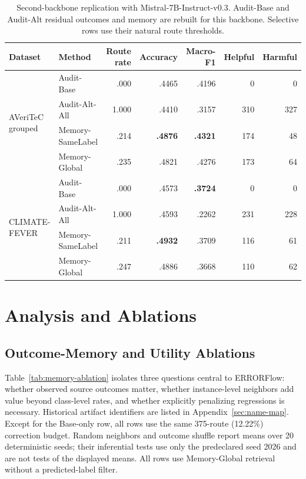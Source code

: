 \documentclass[runningheads]{llncs}
\begin{document}
\begin{table}[t]
\caption{Second-backbone replication with Mistral-7B-Instruct-v0.3.
Audit-Base and Audit-Alt residual outcomes and memory are rebuilt for this backbone. Selective
rows use their natural route thresholds.}
\label{tab:second-backbone}
\centering\small
\begin{tabular}{llrrrrr}
\toprule
Dataset & Method & Route rate & Accuracy & Macro-F1 & Helpful & Harmful \\
\midrule
\multirow{4}{*}{AVeriTeC grouped}
 & Audit-Base & .000 & .4465 & .4196 & 0 & 0 \\
 & Audit-Alt-All & 1.000 & .4410 & .3157 & 310 & 327 \\
 & Memory-SameLabel & .214 & \textbf{.4876} & \textbf{.4321} & 174 & 48 \\
 & Memory-Global & .235 & .4821 & .4276 & 173 & 64 \\
\midrule
\multirow{4}{*}{CLIMATE-FEVER}
 & Audit-Base & .000 & .4573 & \textbf{.3724} & 0 & 0 \\
 & Audit-Alt-All & 1.000 & .4593 & .2262 & 231 & 228 \\
 & Memory-SameLabel & .211 & \textbf{.4932} & .3709 & 116 & 61 \\
 & Memory-Global & .247 & .4886 & .3668 & 110 & 62 \\
\bottomrule
\end{tabular}
\end{table}

\section{Analysis and Ablations}

\subsection{Outcome-Memory and Utility Ablations}
\label{sec:memory-ablation}

Table~\ref{tab:memory-ablation} isolates three questions central to ERRORFlow:
whether observed source outcomes matter, whether instance-level neighbors add value
beyond class-level rates, and whether explicitly penalizing regressions is
necessary. Historical artifact identifiers are listed in
Appendix~\ref{sec:name-map}. Except for the Base-only row, all rows use the
same 375-route (12.22\%) correction budget. Random neighbors and outcome
shuffle report means over 20 deterministic seeds; their inferential
tests use only the predeclared seed 2026 and are not tests of the displayed
means. All rows use Memory-Global retrieval without a predicted-label filter.
\end{document}
